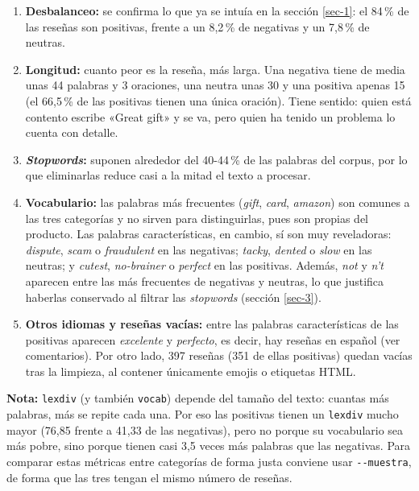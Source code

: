 \documentclass[10pt,a4paper]{article}
\begin{document}
\begin{enumerate}
    \item \textbf{Desbalanceo:} se confirma lo que ya se intuía en la sección \ref{sec-1}: el 84\,\% de las reseñas son
    positivas, frente a un 8,2\,\% de negativas y un 7,8\,\% de neutras.
    \item \textbf{Longitud:} cuanto peor es la reseña, más larga. Una negativa tiene de media unas 44 palabras y 3 oraciones,
    una neutra unas 30 y una positiva apenas 15 (el 66,5\,\% de las positivas tienen una única oración). Tiene sentido:
    quien está contento escribe «Great gift» y se va, pero quien ha tenido un problema lo cuenta con detalle.
    \item \textbf{\textit{Stopwords}:} suponen alrededor del 40-44\,\% de las palabras del corpus, por lo que eliminarlas
    reduce casi a la mitad el texto a procesar.
    \item \textbf{Vocabulario:} las palabras más frecuentes (\textit{gift}, \textit{card}, \textit{amazon}) son comunes a
    las tres categorías y no sirven para distinguirlas, pues son propias del producto. Las palabras características,
    en cambio, sí son muy reveladoras: \textit{dispute}, \textit{scam} o \textit{fraudulent} en las negativas;
    \textit{tacky}, \textit{dented} o \textit{slow} en las neutras; y \textit{cutest}, \textit{no-brainer} o
    \textit{perfect} en las positivas. Además, \textit{not} y \textit{n't} aparecen entre las más frecuentes de negativas
    y neutras, lo que justifica haberlas conservado al filtrar las \textit{stopwords} (sección \ref{sec-3}).
    \item \textbf{Otros idiomas y reseñas vacías:} entre las palabras características de las positivas aparecen
    \textit{excelente} y \textit{perfecto}, es decir, hay reseñas en español (ver comentarios). Por otro lado, 397 reseñas
    (351 de ellas positivas) quedan vacías tras la limpieza, al contener únicamente emojis o etiquetas HTML.
\end{enumerate}

\noindent \textbf{Nota:} \texttt{lexdiv} (y también \texttt{vocab}) depende del tamaño del texto: cuantas más palabras,
más se repite cada una. Por eso las positivas tienen un \texttt{lexdiv} mucho mayor (76,85 frente a 41,33 de las
negativas), pero no porque su vocabulario sea más pobre, sino porque tienen casi 3,5 veces más palabras que las
negativas. Para comparar estas métricas entre categorías de forma justa conviene usar
\texttt{-{}-muestra}, de forma que las tres tengan el mismo número de reseñas.
\end{document}
